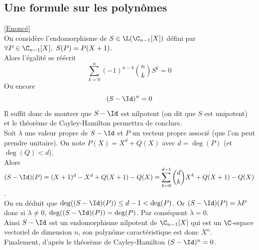 \documentclass[8pt]{book}
\begin{document}
	\subsection{Une formule sur les polynômes }
	\label{Une formule sur les polynômes corrigé}
	\textcolor{blue}{\hyperref[Une formule sur les polynômes]{[Enoncé]}}\\
	On considère l'endomorphisme de $S\in \L(\C_{n-1}[X])$ défini par $\forall P\in \C_{n-1}[X],\ S(P)=P(X+1)$.\\
	Alors l'égalité se réécrit
	$$\sum_{k=0}^n(-1)^{n-k}\binom{n}{k}S^k=0$$
	Ou encore
	$$(S-\Id)^n=0$$
	Il suffit donc de montrer que $S-\Id$ est nilpotent (on dit que $S$ est unipotent) et le théorème de Cayley-Hamilton permettra de conclure.\\
	Soit $\lambda$ une valeur propre de $S-\Id$ et $P$ un vecteur propre associé (que l'on peut prendre unitaire). On note $P(X)=X^d+Q(X)$ avec $d=\deg(P)$ (et $\deg(Q)<d$).\\
	Alors $(S-\Id)(P)=(X+1)^d-X^d+Q(X+1)-Q(X)=\displaystyle\sum_{k=0}^{d-1}\binom{d}{k}X^k+Q(X+1)-Q(X)$.\\
	On en déduit que $\deg((S-\Id)(P))\leq d-1<\deg(P)$. Or $(S-\Id)(P)=\lambda P$ donc si $\lambda\ne 0$, $\deg((S-\Id)(P))=\deg(P)$. Par conséquent $\lambda=0$.\\
	Ainsi $S-\Id$ est un endomorphisme nilpotent de $\C_{n-1}[X]$ qui est un $\C$-espace vectoriel de dimension $n$, son polynôme caractéristique est donc $X^n$.\\
	Finalement, d'après le théorème de Cayley-Hamilton $(S-\Id)^n=0$.
\end{document}
